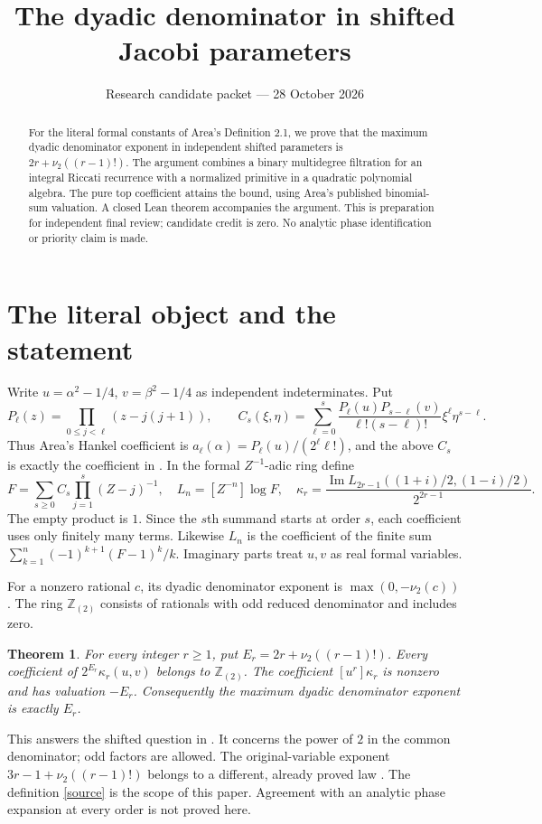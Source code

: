 \documentclass[11pt]{article}
\title{The dyadic denominator in shifted Jacobi parameters}
\author{}\date{Research candidate packet --- 28 October 2026}
\newtheorem{theorem}{Theorem}
\newcommand{\Z}{\mathbb Z}\newcommand{\Q}{\mathbb Q}
\newcommand{\loc}{\Z_{(2)}}\newcommand{\val}{\nu_2}
\newcommand{\coef}[1]{\left[#1\right]}
\begin{document}
\maketitle\vspace{-2em}
\begin{abstract}
For the literal formal constants of Area's Definition 2.1, we prove that the maximum dyadic denominator exponent in independent shifted parameters is $2r+\nu_2((r-1)!)$. The argument combines a binary multidegree filtration for an integral Riccati recurrence with a normalized primitive in a quadratic polynomial algebra. The pure top coefficient attains the bound, using Area's published binomial-sum valuation. A closed Lean theorem accompanies the argument. This is preparation for independent final review; candidate credit is zero. No analytic phase identification or priority claim is made.
\end{abstract}

\section{The literal object and the statement}
Write $u=\alpha^2-1/4$, $v=\beta^2-1/4$ as independent indeterminates. Put
\[
 P_\ell(z)=\prod_{0\le j<\ell}(z-j(j+1)),\qquad
 C_s(\xi,\eta)=\sum_{\ell=0}^s
 \frac{P_\ell(u)P_{s-\ell}(v)}{\ell!(s-\ell)!}\xi^\ell\eta^{s-\ell}.
\]
Thus Area's Hankel coefficient is $a_\ell(\alpha)=P_\ell(u)/(2^\ell\ell!)$, and the above $C_s$ is exactly the coefficient in \cite[Eq.~(6)]{primary}. In the formal $Z^{-1}$-adic ring define
\begin{equation}\label{source}
 F=\sum_{s\ge0}C_s\prod_{j=1}^s(Z-j)^{-1},\quad
 L_n=\coef{Z^{-n}}\log F,\quad
 \kappa_r=\frac{\operatorname{Im}L_{2r-1}((1+i)/2,(1-i)/2)}{2^{2r-1}}.
\end{equation}
The empty product is $1$. Since the $s$th summand starts at order $s$, each coefficient uses only finitely many terms. Likewise $L_n$ is the coefficient of the finite sum $\sum_{k=1}^n(-1)^{k+1}(F-1)^k/k$. Imaginary parts treat $u,v$ as real formal variables.

For a nonzero rational $c$, its dyadic denominator exponent is $\max(0,-\val(c))$. The ring $\loc$ consists of rationals with odd reduced denominator and includes zero.
\begin{theorem}\label{main}
For every integer $r\ge1$, put $E_r=2r+\val((r-1)!)$. Every coefficient of $2^{E_r}\kappa_r(u,v)$ belongs to $\loc$. The coefficient $\coef{u^r}\kappa_r$ is nonzero and has valuation $-E_r$. Consequently the maximum dyadic denominator exponent is exactly $E_r$.
\end{theorem}
This answers the shifted question in \cite[Remark~3.8]{primary}. It concerns the power of $2$ in the common denominator; odd factors are allowed. The original-variable exponent $3r-1+\val((r-1)!)$ belongs to a different, already proved law \cite{companion}. The definition \eqref{source} is the scope of this paper. Agreement with an analytic phase expansion at every order is not proved here.
\end{document}
